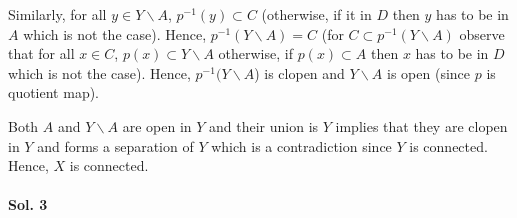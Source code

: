 \documentclass[12pt,reqno]{amsart}
\theoremstyle{plain}
\theoremstyle{definition}
\begin{document}
Similarly, for all $y \in Y \backslash A$, $p^{-1}(y) \subset C$ (otherwise, if it in $D$ then $y$ has to be in $A$ which is not the case). Hence, $p^{-1}(Y \backslash A) = C$ (for $C \subset p^{-1}(Y \backslash A)$ observe that for all $x \in C$, $p(x) \subset Y \backslash A$ otherwise, if $p(x) \subset A$ then $x$ has to be in $D$ which is not the case). Hence, $p^{-1}(Y \backslash A$) is clopen and $Y \backslash A$ is open (since $p$ is quotient map). 

Both $A$ and $Y \backslash A$ are open in $Y$ and their union is $Y$ implies that they are clopen in $Y$ and forms a separation of $Y$ which is a contradiction since $Y$ is connected. Hence, $X$ is connected.

\begin{center}
    \item \paragraph{{\bf Sol. 3}}
\end{center}
\end{document}
